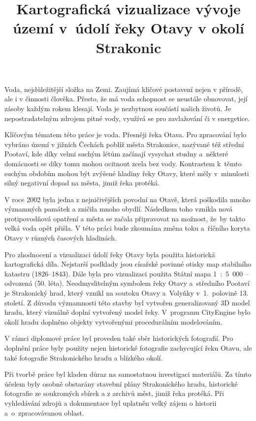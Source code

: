 \documentclass[thesis=M,czech]{FITthesis}[2012/06/26]
\title{Kartografická vizualizace vývoje území v~údolí řeky Otavy v okolí Strakonic}
\begin{document}

\begin{introduction}
Voda, nejdůležitější složka na Zemi. Zaujímá klíčové postavení nejen v přírodě, ale i v činnosti člověka. Přesto, že má voda schopnost se neustále obnovovat, její zásoby každým rokem klesají. Voda je nezbytnou součástí našich životů. Je nepostradatelným zdrojem pitné vody, využívá se pro zavlažování či v energetice. 

Klíčovým tématem této práce je voda. Přesněji řeka Otava. Pro zpracování bylo vybráno území v jižních Čechách poblíž města Strakonice, nazývané též střední Pootaví, kde díky velmi suchým létům začínají vysychat studny a~některé domácnosti se díky tomu mohou ocitnout zcela bez vody. Kontrastem k~těmto suchým obdobím mohou být zvýšené hladiny řeky Otavy, které měly v~minulosti silný negativní dopad na města, jimiž řeka protéká.

V roce 2002 byla jedna z nejničivějších povodní na Otavě, která poškodila mnoho významných památek a zničila mnoho obydlí. Následkem toho vznikla nová protipovodňová opatření a města se začala připravovat na možnost, že~by takto velká voda opět přišla. V této práci bude zkoumána změna toku a~říčního koryta Otavy v různých časových hladinách.

Pro zhodnocení a vizualizaci údolí řeky Otavy byla použita historická kartografická díla. Nejstarší podklady jsou císařské povinné otisky map stabilního katastru (1826–1843). Dále byla pro vizualizaci použita Státní mapa 1~:~5~000 – odvozená (50. léta). Neodmyslitelným symbolem řeky Otavy a~středního Pootaví je Strakonický hrad, který vznikl na soutoku Otavy a~Volyňky v~1.~polovině 13. století. Z důvodu významnosti této stavby byl vytvořen generalizovaný 3D model hradu, který vizuálně doplní vytvořený model řeky. V~programu CityEngine bylo okolí hradu doplněno objekty vytvořenými procedurálním modelováním.

V rámci diplomové práce byl proveden také sběr historických fotografií. Pro doplnění práce byly použity nejen historické fotografie zachycující řeku Otavu, ale také fotografie Strakonického hradu a blízkého okolí.

Při tvorbě práce byl kladen důraz na samostatnou investigaci materiálů. Za tímto účelem byly osobně obstarány stavební plány Strakonického hradu, historické fotografie ze soukromých sbírek a z archivů měst, jimiž řeka protéká. Při vyhledávání zdrojů a dokumentace byl uplatněn velký zájem o historii a~o~zpracovávanou oblast. 


\end{introduction}
\end{document}
